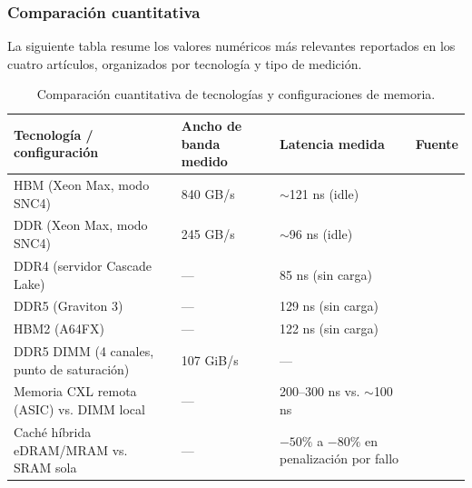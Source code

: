 \subsubsection{Comparación cuantitativa}

La siguiente tabla resume los valores numéricos más relevantes reportados en los cuatro artículos,
organizados por tecnología y tipo de medición.

\begin{table}[ht]
\centering
\small
\begin{tabular}{p{4.2cm} p{3cm} p{3cm} p{3.2cm}}
\toprule
\textbf{Tecnología / configuración} &
\textbf{Ancho de banda medido} &
\textbf{Latencia medida} &
\textbf{Fuente} \\
\midrule

HBM (Xeon Max, modo SNC4) &
840 GB/s &
$\sim$121 ns (idle) &
\cite{ibeid2025aurora} \\

DDR (Xeon Max, modo SNC4) &
245 GB/s &
$\sim$96 ns (idle) &
\cite{ibeid2025aurora} \\

DDR4 (servidor Cascade Lake) &
--- &
85 ns (sin carga) &
\cite{esmailidokht2024mess} \\

DDR5 (Graviton 3) &
--- &
129 ns (sin carga) &
\cite{esmailidokht2024mess} \\

HBM2 (A64FX) &
--- &
122 ns (sin carga) &
\cite{esmailidokht2024mess} \\

DDR5 DIMM (4 canales, punto de saturación) &
107 GiB/s &
--- &
\cite{wang2024hitchhiker} \\

Memoria CXL remota (ASIC) vs. DIMM local &
--- &
200--300 ns vs. $\sim$100 ns &
\cite{wang2024hitchhiker} \\

Caché híbrida eDRAM/MRAM vs. SRAM sola &
--- &
$-50\%$ a $-80\%$ en penalización por fallo &
\cite{lurbe2023controlador} \\

\bottomrule
\end{tabular}
\caption{Comparación cuantitativa de tecnologías y configuraciones de memoria.}
\label{tab:comparacion-memoria}
\end{table}

